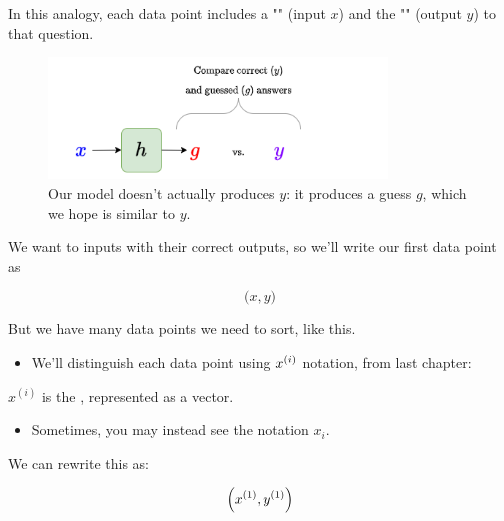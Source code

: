         In this analogy, each data point includes a "" (input $x$) and the "" (output $y$) to that question.

        \begin{figure}[H]
            \centering
            \includegraphics[width=90mm,scale=0.5]{images/regression_images/hypothesis_guess.png}
        
            \caption*{Our model doesn't actually produces $y$: it produces a guess $g$, which we hope is similar to $y$.}
        \end{figure}
        
        We want to  inputs with their correct outputs, so we'll write our first data point as 

        \begin{equation}
            \Big(x,y \Big)
        \end{equation}

        But we have many data points we need to sort, like this.

        \begin{itemize}
            \item We'll distinguish each data point using $x^{(i)}$ notation, from last chapter:\\
        \end{itemize}

        \begin{notation}
            $x^{(i)}$ is the , represented as a vector.

            \begin{itemize}
                \item Sometimes, you may instead see the notation $x_i$.
            \end{itemize}
            
        \end{notation}
        
        We can rewrite this as:
        
        \begin{equation*}
            \left( x^{(1)}, y^{(1)} \right)
        \end{equation*}
        
